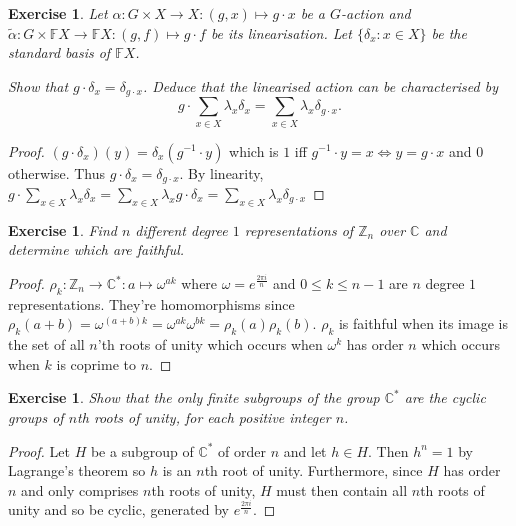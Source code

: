 \documentclass{article}
\newtheorem{exercise}[theorem]{Exercise}
\begin{document}
\begin{exercise}
Let $\alpha : G \times X \to X : (g, x) \mapsto g \cdot x$ be a $G$-action and $\tilde{\alpha} : G \times \mathbb{F}X \to \mathbb{F}X : (g, f) \mapsto g \cdot f$ be its linearisation. Let $\{\delta_x : x \in X\}$ be the standard basis of $\mathbb{F}X$. 

\noindent Show that $g \cdot \delta_x = \delta_{g \cdot x}$. Deduce that the linearised action can be characterised by
\[
g \cdot \sum_{x \in X} \lambda_x \delta_x = \sum_{x \in X} \lambda_x \delta_{g \cdot x}.
\]
\end{exercise}
\begin{proof}
$(g\cdot\delta_x)(y)=\delta_x(g^{-1}\cdot y)$ which is $1$ iff $g^{-1}\cdot y=x\iff y=g\cdot x$ and $0$ otherwise. Thus $g \cdot \delta_x = \delta_{g \cdot x}$. By linearity, $g \cdot \sum_{x \in X} \lambda_x \delta_x=\sum_{x \in X} \lambda_x g\cdot\delta_x=\sum_{x \in X} \lambda_x \delta_{g \cdot x}$
\end{proof}


\begin{exercise}
Find $n$ different degree $1$ representations of $\mathbb{Z}_n$ over $\mathbb{C}$ and determine which are faithful.
\end{exercise}
\begin{proof}
$\rho_k:\mathbb{Z}_n\to\mathbb{C}^{*}:a\mapsto\omega^{ak}$ where $\omega=e^{\frac{2\pi i}{n}}$ and $0\leq k\leq n-1$ are $n$ degree $1$ representations. They're homomorphisms since $\rho_k(a+b)=\omega^{(a+b)k}=\omega^{ak}\omega^{bk}=\rho_k(a)\rho_k(b)$. $\rho_k$ is faithful when its image is the set of all $n$'th roots of unity which occurs when $\omega^k$ has order $n$ which occurs when $k$ is coprime to $n$.
\end{proof}

\begin{exercise}
Show that the only finite subgroups of the group $\mathbb{C}^*$ are the cyclic groups of $n$th roots of unity, for each positive integer $n$.
\end{exercise}
\begin{proof}
Let $H$ be a subgroup of $\mathbb{C}^*$ of order $n$ and let $h\in H$. Then $h^n=1$ by Lagrange's theorem so $h$ is an $n$th root of unity. Furthermore, since $H$ has order $n$ and only comprises $n$th roots of unity, $H$ must then contain all $n$th roots of unity and so be cyclic, generated by $e^{\frac{2\pi i}{n}}$.
\end{proof}
\end{document}
